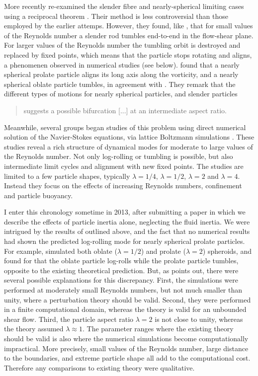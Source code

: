 \documentclass[thesis.tex]{subfiles}
\begin{document}
More recently \citet{subramanian2005,subramanian2006} re-examined the slender fibre and nearly-spherical limiting cases using a reciprocal theorem \cite{kim1991,lovalenti1993}. Their method is less controversial than those employed by the earlier attemps. However, they found, like \citet{harper1968}, that for small values of the Reynolds number a slender rod tumbles end-to-end in the flow-shear plane. For larger values of the Reynolds number the tumbling orbit is destroyed and replaced by fixed points, which means that the particle stops rotating and aligns, a phenomenen observed in numerical studies \cite{ding2000} (see below). \citet{subramanian2006} found that a nearly spherical prolate particle aligns its long axis along the vorticity, and a nearly spherical oblate particle tumbles, in agreement with \citet{saffman1956}. They remark that the different types of motions for nearly spherical particles, and slender particles \blockquote{suggests a possible bifurcation [...] at an intermediate aspect ratio.}

Meanwhile, several groups began studies of this problem using direct numerical solution of the Navier-Stokes equations, via lattice Boltzmann simulations \cite{feng1995,ding2000,qi2003,yu2007,huang2012,rosen2014,mao2014,rosen2015a,rosen2015b}. These studies reveal a rich structure of dynamical modes for moderate to large values of the Reynolds number. Not only log-rolling or tumbling is possible, but also intermediate limit cycles and alignment with new fixed points. The studies are limited to a few particle shapes, typically $\lambda=1/4$, $\lambda=1/2$, $\lambda=2$ and $\lambda=4$. Instead they focus on the effects of increasing Reynolds numbers, confinement and particle buoyancy.

I enter this chronology sometime in 2013, after submitting a paper \cite{einarsson2014} in which we describe the effects of particle inertia alone, neglecting the fluid inertia. We were intrigued by the results of \citet{subramanian2006,subramanian2006} outlined above, and the fact that no numerical results had shown the predicted log-rolling mode for nearly spherical prolate particles. For example, \citet{qi2003} simulated both oblate ($\lambda=1/2$) and prolate ($\lambda=2$) spheroids, and found for that the oblate particle log-rolls while the prolate particle tumbles, opposite to the existing theoretical prediction. But, as \citet{subramanian2006} points out, there were several possible explanations for this discrepancy. First, the simulations were performed at moderately small Reynolds numbers, but not much smaller than unity, where a perturbation theory should be valid. Second, they were performed in a finite computational domain, whereas the theory is valid for an unbounded shear flow. Third, the particle aspect ratio $\lambda=2$ is not close to unity, whereas the theory assumed $\lambda\approx1$. The parameter ranges where the existing theory should be valid is also where the numerical simulations become computationally impractical. More precisely, small values of the Reynolds number, large distance to the boundaries, and extreme particle shape all add to the computational cost. Therefore any comparisons to existing theory were qualitative.
\end{document}
